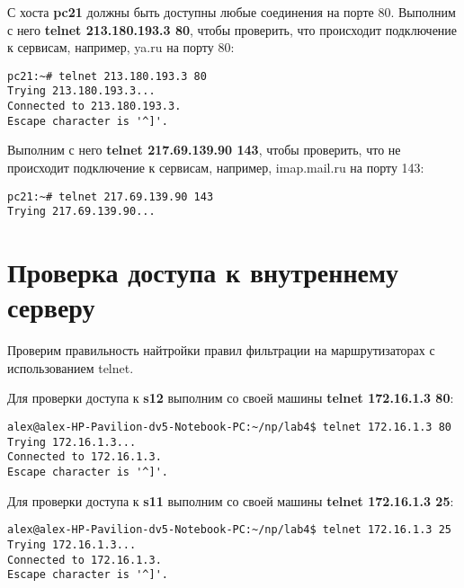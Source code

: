 \documentclass[a4paper,12pt]{article}
\begin{document}
С хоста \textbf{pc21} должны быть доступны любые соединения на порте 80.
Выполним с него \textbf{telnet 213.180.193.3 80},  чтобы проверить, что
происходит подключение к сервисам, например, ya.ru на порту 80:
\begin{Verbatim}
pc21:~# telnet 213.180.193.3 80
Trying 213.180.193.3...
Connected to 213.180.193.3.
Escape character is '^]'.
\end{Verbatim}

Выполним с него \textbf{telnet 217.69.139.90 143},  чтобы проверить, что не
происходит подключение к сервисам, например, imap.mail.ru на порту 143:
\begin{Verbatim}
pc21:~# telnet 217.69.139.90 143
Trying 217.69.139.90...
\end{Verbatim}


\section{Проверка доступа к внутреннему серверу}

Проверим правильность найтройки правил фильтрации на маршрутизаторах
с использованием  telnet.

Для проверки доступа к \textbf{s12} выполним со своей машины
\textbf{telnet 172.16.1.3 80}:
\begin{Verbatim}
alex@alex-HP-Pavilion-dv5-Notebook-PC:~/np/lab4$ telnet 172.16.1.3 80
Trying 172.16.1.3...
Connected to 172.16.1.3.
Escape character is '^]'.
\end{Verbatim}

Для проверки доступа к \textbf{s11} выполним со своей машины
\textbf{telnet 172.16.1.3 25}:
\begin{Verbatim}
alex@alex-HP-Pavilion-dv5-Notebook-PC:~/np/lab4$ telnet 172.16.1.3 25
Trying 172.16.1.3...
Connected to 172.16.1.3.
Escape character is '^]'.
\end{Verbatim}
\end{document}
